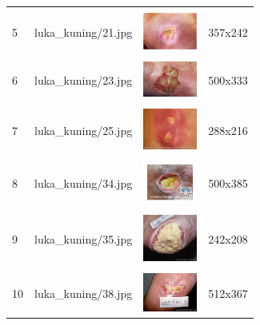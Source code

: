 \begin{table}[H]
\begin{tabular}{|m{0.2in}|m{1.2in}|m{0.7in}|m{0.7in}|}
		& &  &  \\
		5& 
		luka\_kuning/21.jpg &
		\includegraphics[width=0.7in]{gambar/dataset_citra/luka_kuning/bahan/21.jpg}&
		357x242\\
		\hline
		
		& &  &  \\
		6& 
		luka\_kuning/23.jpg &
		\includegraphics[width=0.7in]{gambar/dataset_citra/luka_kuning/bahan/23.jpg}&
		500x333\\
		\hline
		
		& &  &  \\
		7& 
		luka\_kuning/25.jpg &
		\includegraphics[width=0.7in]{gambar/dataset_citra/luka_kuning/bahan/25.jpg}&
		288x216\\
		\hline
				
		& &  &  \\
		8 & 
		luka\_kuning/34.jpg &
		\includegraphics[width=0.7in]{gambar/dataset_citra/luka_kuning/bahan/34.jpg}&
		500x385\\
		\hline
		
		& &  &  \\
		9& 
		luka\_kuning/35.jpg &
		\includegraphics[width=0.7in]{gambar/dataset_citra/luka_kuning/bahan/35.jpg}&
		242x208\\
		\hline
		
		& &  &  \\
		10& 
		luka\_kuning/38.jpg &
		\includegraphics[width=0.7in]{gambar/dataset_citra/luka_kuning/bahan/38.jpg}&
		512x367\\
		\hline

	\end{tabular}
\end{table}


